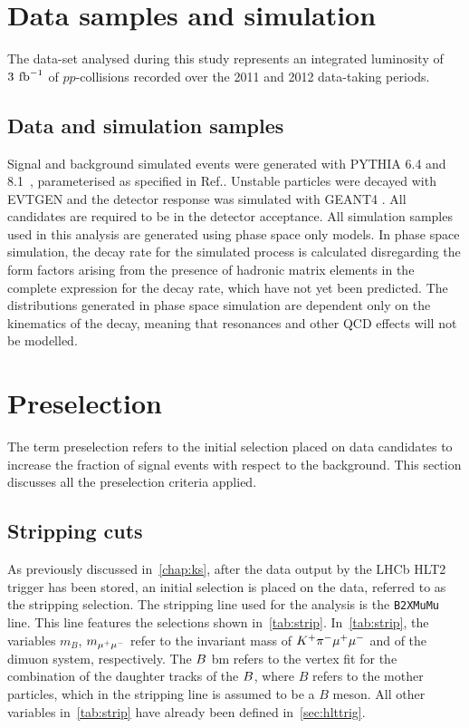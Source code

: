 \section{Data samples and simulation}\label{Sec:Exp}\label{Sec:Selection}
\label{sec:datasiminto}
The data-set analysed during this study represents an integrated luminosity of $3\:\mbox{\,fb}^{-1}$ of
$pp$-collisions recorded over the 2011 and 2012 data-taking periods. 

\subsection{Data and simulation samples}\label{Sec:Samples}
Signal and background simulated events were generated with PYTHIA 6.4 and 
8.1~\cite{pythia6,pythia8}, parameterised as 
specified in Ref.\cite{LHCb-PROC-2010-056}. Unstable particles were decayed with EVTGEN \cite{Lange:2001uf} and the detector response was simulated with 
GEANT4 \cite{Agostinelli:2002hh,LHCb-PROC-2011-006,*Allison:2006ve}. All candidates are required to be in the detector acceptance. All simulation samples used in this analysis are generated using phase space only models. In phase space simulation, the decay rate for the simulated process is calculated disregarding the form factors arising from the presence of hadronic matrix elements in the complete expression for the decay rate, which have not yet been predicted. The distributions generated in phase space simulation are dependent only on the kinematics of the decay, meaning that resonances and other QCD effects will not be modelled. 

\section{Preselection}
\label{Sec:Pre}
The term preselection refers to the initial selection placed on data candidates to increase the fraction of signal events with respect to the background.
This section discusses all the preselection criteria applied. %
\subsection{Stripping cuts}\label{Sec:Strip}
As previously discussed in~\autoref{chap:ks}, after the data output by the LHCb HLT2 trigger has been stored, an initial selection is placed on the data, referred to as the stripping selection. The stripping line used for the \Lbpi analysis is the {\tt B2XMuMu} line. This line features the selections shown in~\autoref{tab:strip}. In~\autoref{tab:strip}, the variables $m_{B}$, $m_{{\mu^+\mu^-}}$ refer to the invariant mass of ${{K}^+}{{\pi}^-}{\mu^+\mu^-}$ and of the dimuon system, respectively. The ${B}$ \gls{bm} refers to the vertex fit for the combination of the daughter tracks of the ${B}$, where $B$ refers to the mother particles, which in the stripping line is assumed to be a $B$ meson. All other variables in~\autoref{tab:strip} have already been defined in~\autoref{sec:hlttrig}.%

